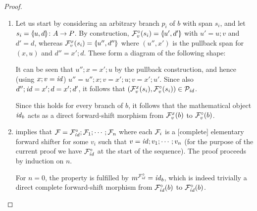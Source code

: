 \begin{proof}
\begin{enumerate}[topsep=\smallskipamount]
\item Let us start by considering an arbitrary branch $p_i$ of $b$ with span $s_i$, and let $s_i=\spanof{u}{d}\of A\to P$. By construction, $\dF v(s_i)=\spanof{u'}{d'}$ with $u'=u;v$ and $d'=d$, whereas $\rF v x(s_i)=\spanof{u''}{d''}$ where $(u'',x')$ is the pullback span for $(x,u)$ and $d''=x';d$. These form a diagram of the following shape:
\begin{center}
\end{center}
It can be seen that $u'';x=x';u$ by the pullback construction, and hence (using $x;v=\id$) $u''=u'';x;v=x';u;v=x';u'$. Since also $d'';\id=x';d=x';d'$, it follows that $(\rF v x(s_i),\dF v(s_i))\in \cP_\id$.

Since this holds for every branch of $b$, it follows that the mathematical object $\id_b$ acts as a direct forward-shift morphism from $\rF v x(b)$ to $\dF v(b)$.

\item {} implies that $\cF=\dF\id;\cF_1;\cdots;\cF_n$ where each $\cF_i$ is a [complete] elementary forward shifter for some $v_i$ such that $v=\id;v_1;\cdots;v_n$ (for the purpose of the current proof we have $\dF\id$ at the start of the sequence). The proof proceeds by induction on $n$.

\smallskip For $n=0$, the property is fulfilled by $m^{\dF\id}=\id_b$, which is indeed trivially a direct complete forward-shift morphism from $\dF\id(b)$ to $\dF\id(b)$.


\end{enumerate}
\end{proof}
